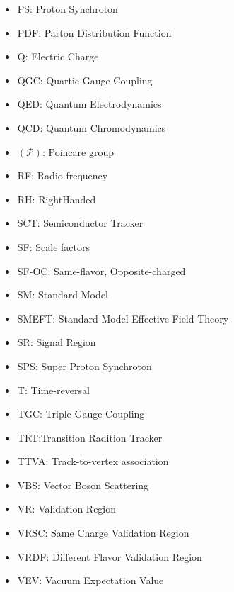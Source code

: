 \begin{itemize}
\item{PS: Proton Synchroton}
\item{PDF: Parton Distribution Function}
\item{Q: Electric Charge}
\item{QGC: Quartic Gauge Coupling}
\item{QED: Quantum Electrodynamics}
\item{QCD: Quantum Chromodynamics}
\item{$(\mathcal{P})$: Poincare group}
\item{RF: Radio frequency}
\item{RH: RightHanded}
\item{SCT: Semiconductor Tracker} 
\item{SF: Scale factors}
\item{SF-OC: Same-flavor, Opposite-charged} 
\item{SM: Standard Model}
\item{SMEFT: Standard Model Effective Field Theory} 
\item{SR: Signal Region}
\item{SPS: Super Proton Synchroton} 
\item{T: Time-reversal}
\item{TGC: Triple Gauge Coupling}
\item{TRT:Transition Radition Tracker} 
\item{TTVA: Track-to-vertex association}
\item{VBS: Vector Boson Scattering}
\item{VR: Validation Region}
\item{VRSC: Same Charge Validation Region}
\item{VRDF: Different Flavor Validation Region}
\item{VEV: Vacuum Expectation Value}
\end{itemize}
